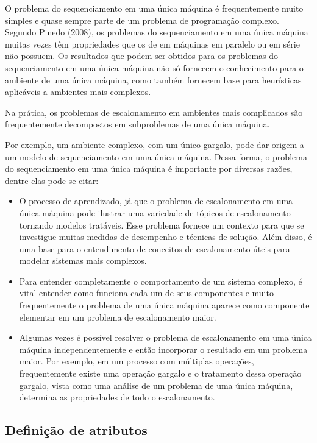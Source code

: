 
O problema do sequenciamento em uma única máquina é frequentemente  muito simples e quase sempre parte de um problema de programação complexo.  Segundo Pinedo (2008), os problemas do sequenciamento em uma única máquina  muitas vezes têm propriedades que os de em máquinas em paralelo ou em série  não possuem. Os resultados que podem ser obtidos para os problemas do  sequenciamento em uma única máquina não só fornecem o conhecimento para o ambiente de uma única máquina, como também fornecem base para heurísticas  aplicáveis a ambientes mais complexos. 

Na prática, os problemas de escalonamento em ambientes mais complicados são frequentemente decompostos em subproblemas de uma única máquina. 

Por exemplo, um ambiente complexo, com um único gargalo, pode dar origem a um modelo de sequenciamento em uma única máquina. Dessa forma, o problema do sequenciamento em uma única máquina é importante por diversas razões, dentre elas pode-se citar: 

\begin{itemize}
\item O processo de aprendizado, já que o problema de escalonamento em uma única máquina  pode ilustrar uma variedade de tópicos de escalonamento tornando modelos tratáveis. Esse problema fornece um contexto para que se  investigue muitas medidas de desempenho e técnicas de solução. Além disso, é uma base para o entendimento de  conceitos de escalonamento úteis para modelar sistemas mais complexos. 

\item Para entender completamente o comportamento de um sistema  complexo, é vital entender como funciona cada um de seus componentes e muito frequentemente o problema de uma única máquina aparece como componente elementar em um problema de escalonamento maior. 

\item Algumas vezes é possível resolver o problema de escalonamento em uma única máquina independentemente e então incorporar o resultado em um problema maior. Por exemplo, em um processo com múltiplas operações, frequentemente existe uma operação gargalo e o tratamento dessa operação gargalo, vista como uma análise de um problema de uma única máquina, determina as propriedades de todo o escalonamento. 

\end{itemize}

\subsection{Definição de atributos}


